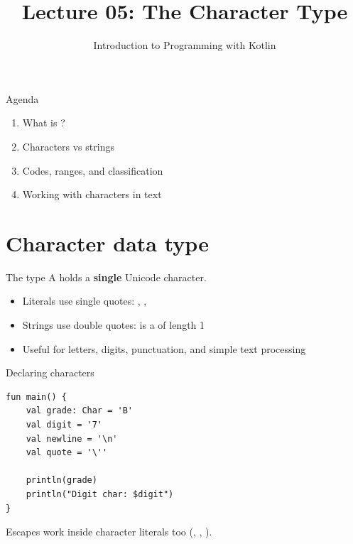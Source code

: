 \documentclass[aspectratio=169,11pt]{beamer}
\title{Lecture 05: The Character Type}
\subtitle{Introduction to Programming with Kotlin}
\begin{document}
    \begin{frame}
        \titlepage
    \end{frame}

    \begin{frame}{Agenda}
        \begin{enumerate}
            \item What is ?
            \item Characters vs strings
            \item Codes, ranges, and classification
            \item Working with characters in text
        \end{enumerate}
    \end{frame}

    \section{Character data type}

    \begin{frame}{The  type}
        A  holds a \textbf{single} Unicode character.
        \vspace{0.6em}
        \begin{itemize}
            \item Literals use single quotes: , , 
            \item Strings use double quotes:  is a  of length 1
            \item Useful for letters, digits, punctuation, and simple text processing
        \end{itemize}
    \end{frame}

    \begin{frame}[fragile]{Declaring characters}
        \begin{lstlisting}
fun main() {
    val grade: Char = 'B'
    val digit = '7'
    val newline = '\n'
    val quote = '\''

    println(grade)
    println("Digit char: $digit")
}
        \end{lstlisting}
        \vspace{0.3em}
        Escapes work inside character literals too (,
        , ).
    \end{frame}
\end{document}
